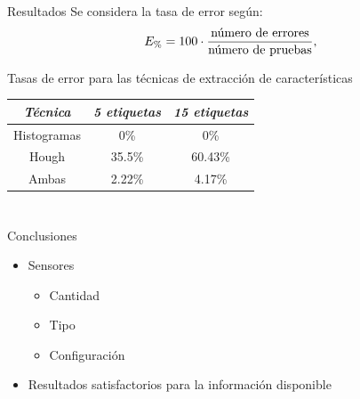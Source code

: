 \documentclass[spanish]{beamer}
\begin{document}
\section[Resultados]{}

\begin{frame}{Resultados}
  Se considera la tasa de error según:
  \begin{equation*}
    E_{\%}=100\cdot\frac{\textrm{número de errores}}{\textrm{número de pruebas}},
  \end{equation*}


  Tasas de error para las técnicas de extracción de características
  \begin{center}\begin{tabular}{ccc}
      \hline \emph{{Técnica}} & \emph{5 etiquetas} & \emph{15 etiquetas}\\
      \hline Histogramas & 0\% & 0\%\\
      \hline Hough & 35.5\% & 60.43\%\\
      \hline Ambas & 2.22\% & 4.17\%\\
      \hline
  \end{tabular}\end{center}
  \label{tablaerrores}


\end{frame}


\section[Conclusiones]{}

\begin{frame}{Conclusiones}
  \begin{itemize}
  \item Sensores
    \begin{itemize}
    \item Cantidad
    \item Tipo
    \item Configuración
    \end{itemize}
  \item Resultados satisfactorios para la información disponible
  \end{itemize}
\end{frame}
\end{document}
